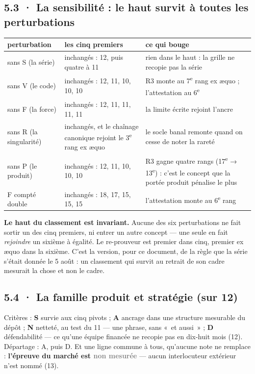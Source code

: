 \documentclass[10pt]{article}
\newcommand{\nm}[1]{\textcolor{grey}{\textbf{#1}}}
\begin{document}
\subsection{5.3 · La sensibilité : le haut survit à toutes les perturbations}

{\small
\renewcommand{\arraystretch}{1.15}
\begin{longtable}{@{}L{4.0cm}L{5.3cm}L{7.7cm}@{}}
\toprule
\textbf{perturbation} & \textbf{les cinq premiers} & \textbf{ce qui bouge} \\ \midrule \endhead
sans S (la série) & inchangés : 12, puis quatre à 11 & rien dans le haut : la grille ne recopie pas la série \\
sans V (le code) & inchangés : 12, 11, 10, 10, 10 & R3 monte au 7\textsuperscript{e} rang ex æquo ; l'attestation au 6\textsuperscript{e} \\
sans F (la force) & inchangés : 12, 11, 11, 11, 11 & la limite écrite rejoint l'ancre \\
sans R (la singularité) & inchangés, et le chaînage canonique rejoint le 3\textsuperscript{e} rang ex æquo & le socle banal remonte quand on cesse de noter la rareté \\
sans P (le produit) & inchangés : 12, 11, 10, 10, 10 & R3 gagne quatre rangs (17\textsuperscript{e} → 13\textsuperscript{e}) : c'est le concept que la portée produit pénalise le plus \\
F compté double & inchangés : 18, 17, 15, 15, 15 & l'attestation monte au 6\textsuperscript{e} rang \\
\bottomrule
\end{longtable}
}

\begin{acquis}
\textbf{Le haut du classement est invariant.} Aucune des six perturbations ne fait sortir un des cinq premiers, ni
entrer un autre concept --- une seule en fait \emph{rejoindre} un sixième à égalité. Le re-prouveur est premier dans
cinq, premier ex æquo dans la sixième. C'est la version, pour ce document, de la règle que la série s'était donnée le 5 août : un classement qui
survit au retrait de son cadre mesurait la chose et non le cadre.
\end{acquis}

\subsection{5.4 · La famille produit et stratégie (sur 12)}

Critères : \textbf{S} survie aux cinq pivots ; \textbf{A} ancrage dans une structure mesurable du dépôt ;
\textbf{N} netteté, au test du 11 --- une phrase, sans «~et aussi~» ; \textbf{D} défendabilité --- ce qu'une équipe
financée ne recopie pas en dix-huit mois (12). Départage : A, puis D. Et une ligne commune à tous, qu'aucune note
ne remplace : \textbf{l'épreuve du marché est \nm{non mesurée}} --- aucun interlocuteur extérieur n'est nommé (13).
\end{document}

